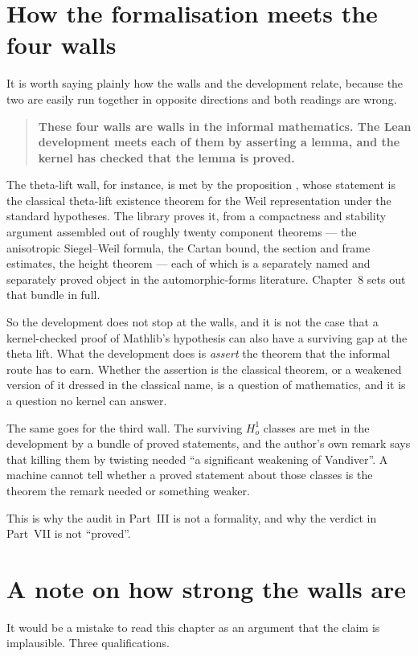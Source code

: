 \section{How the formalisation meets the four walls}It is worth saying plainly how the walls and the development relate, because
the two are easily run together in opposite directions and both readings are
wrong.

\begin{quote}
\textbf{These four walls are walls in the informal mathematics. The Lean
development meets each of them by asserting a lemma, and the kernel has
checked that the lemma is proved.}
\end{quote}

The theta-lift wall, for instance, is met by the proposition
, whose statement is the classical
theta-lift existence theorem for the Weil representation under the standard
hypotheses. The library proves it, from a compactness and stability argument
assembled out of roughly twenty component theorems --- the anisotropic
Siegel--Weil formula, the Cartan bound, the section and frame estimates, the
height theorem --- each of which is a separately named and separately proved
object in the automorphic-forms literature. Chapter~8 sets out that bundle
in full.

So the development does not stop at the walls, and it is not the case that a
kernel-checked proof of Mathlib's hypothesis can also have a surviving gap at
the theta lift. What the development does is \emph{assert} the theorem that
the informal route has to earn. Whether the assertion is the classical
theorem, or a weakened version of it dressed in the classical name, is a
question of mathematics, and it is a question no kernel can answer.

The same goes for the third wall. The surviving $H^1_o$ classes are met in
the development by a bundle of proved statements, and the author's own remark
says that killing them by twisting needed ``a significant weakening of
Vandiver''. A machine cannot tell whether a proved statement about those
classes is the theorem the remark needed or something weaker.

This is why the audit in Part~III is not a formality, and why the verdict in
Part~VII is not ``proved''.

\section{A note on how strong the walls are}It would be a mistake to read this chapter as an argument that the claim is
implausible. Three qualifications.

